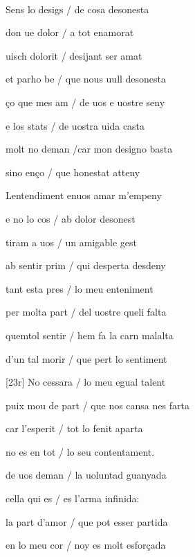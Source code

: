 \documentclass[12pt]{article}
\renewcommand{\espaiAbansEtiquetaPoema}{\vspace{0ex}}
\begin{document}
\begin{estrofa}

\espaiAbansEtiquetaPoema

\\

\end{estrofa}


\begin{estrofa}

 Sens lo desigs / de cosa desonesta

 don ue dolor / a tot enamorat

 uisch dolorit / desijant ser amat

 et parho be / que nous uull desonesta

 \c{c}o que mes am / de uos e uostre seny

 e los stats / de uostra uida casta

 molt no deman /car mon designo basta

 sino en\c{c}o / que honestat atteny

\end{estrofa}



\begin{estrofa}

 Lentendiment enuos amar m'empeny

 e no lo cos / ab dolor desonest

 tiram a uos / un amigable gest

 ab sentir prim / qui desperta desdeny

 tant esta pres / lo meu enteniment

 per molta part / del uostre queli \sout{f}alta

 quemtol sentir / hem fa la carn malalta

 d'un tal morir / que pert lo sentiment

\end{estrofa}



\begin{estrofa}

 [23r] No cessara / lo meu egual talent

 puix mou de part / que nos cansa nes farta

 car l'esperit / tot lo fenit aparta

 no es en tot / lo seu contentament.

 de uos deman / la uoluntad guanyada

 cella qui es / es l'arma infinida:

 la part d'amor / que pot esser partida

 en lo meu cor / noy es molt esfor\c{c}ada

\end{estrofa}
\end{document}
